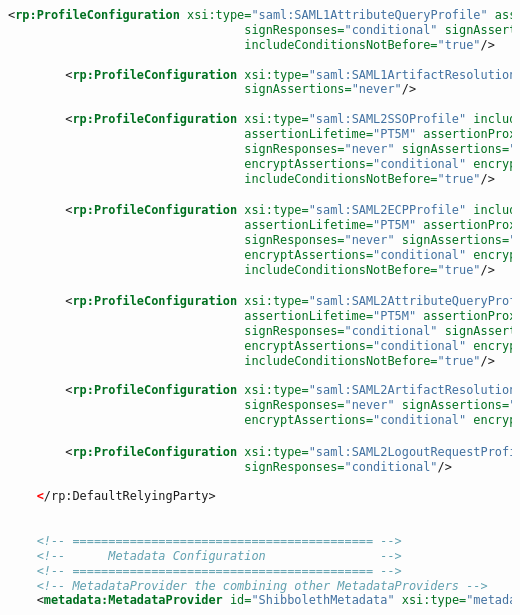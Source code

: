 \begin{lstlisting}[language=xml]
        <rp:ProfileConfiguration xsi:type="saml:SAML1AttributeQueryProfile" assertionLifetime="PT5M" 
                                 signResponses="conditional" signAssertions="never"
                                 includeConditionsNotBefore="true"/>
        
        <rp:ProfileConfiguration xsi:type="saml:SAML1ArtifactResolutionProfile" signResponses="conditional" 
                                 signAssertions="never"/>
        
        <rp:ProfileConfiguration xsi:type="saml:SAML2SSOProfile" includeAttributeStatement="true" 
                                 assertionLifetime="PT5M" assertionProxyCount="0" 
                                 signResponses="never" signAssertions="always" 
                                 encryptAssertions="conditional" encryptNameIds="never"
                                 includeConditionsNotBefore="true"/>

        <rp:ProfileConfiguration xsi:type="saml:SAML2ECPProfile" includeAttributeStatement="true" 
                                 assertionLifetime="PT5M" assertionProxyCount="0" 
                                 signResponses="never" signAssertions="always" 
                                 encryptAssertions="conditional" encryptNameIds="never"
                                 includeConditionsNotBefore="true"/>

        <rp:ProfileConfiguration xsi:type="saml:SAML2AttributeQueryProfile" 
                                 assertionLifetime="PT5M" assertionProxyCount="0" 
                                 signResponses="conditional" signAssertions="never" 
                                 encryptAssertions="conditional" encryptNameIds="never"
                                 includeConditionsNotBefore="true"/>
        
        <rp:ProfileConfiguration xsi:type="saml:SAML2ArtifactResolutionProfile" 
                                 signResponses="never" signAssertions="always" 
                                 encryptAssertions="conditional" encryptNameIds="never"/>

        <rp:ProfileConfiguration xsi:type="saml:SAML2LogoutRequestProfile"
                                 signResponses="conditional"/>
        
    </rp:DefaultRelyingParty>
        
    
    <!-- ========================================== -->
    <!--      Metadata Configuration                -->
    <!-- ========================================== -->
    <!-- MetadataProvider the combining other MetadataProviders -->
    <metadata:MetadataProvider id="ShibbolethMetadata" xsi:type="metadata:ChainingMetadataProvider">
    

\end{lstlisting}

